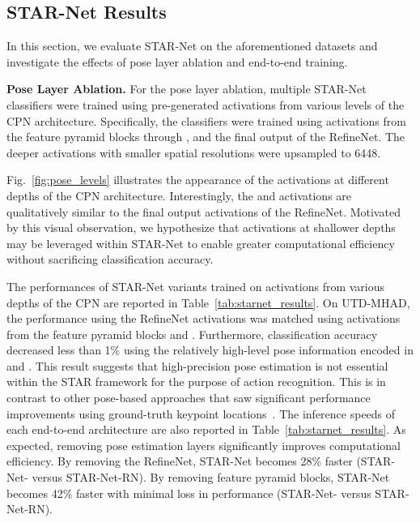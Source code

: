 \documentclass[10pt, conference, compsocconf]{IEEEtran}
\begin{document}
\subsection{STAR-Net Results}
\label{sec:starnet_results}

In this section, we evaluate STAR-Net on the aforementioned datasets and investigate the effects of pose layer ablation and end-to-end training. 

\smallskip\noindent\textbf{Pose Layer Ablation.} For the pose layer ablation, multiple STAR-Net classifiers were trained using pre-generated activations from various levels of the CPN architecture. Specifically, the classifiers were trained using activations from the feature pyramid blocks  through , and the final output of the RefineNet. The deeper activations with smaller spatial resolutions were upsampled to 6448. 


Fig.~\ref{fig:pose_levels} illustrates the appearance of the activations at different depths of the CPN architecture. Interestingly, the  and  activations are qualitatively similar to the final output activations of the RefineNet. Motivated by this visual observation, we hypothesize that activations at shallower depths may be leveraged within STAR-Net to enable greater computational efficiency without sacrificing classification accuracy. 



The performances of STAR-Net variants trained on activations from various depths of the CPN are reported in Table~\ref{tab:starnet_results}. On UTD-MHAD, the performance using the RefineNet activations was matched using activations from the feature pyramid blocks  and . Furthermore, classification accuracy decreased less than 1\% using the relatively high-level pose information encoded in  and . This result suggests that high-precision pose estimation is not essential within the STAR framework for the purpose of action recognition. This is in contrast to other pose-based approaches that saw significant performance improvements using ground-truth keypoint locations~\cite{choutas2018potion, cheronICCV15, zolfaghari2017chained}. The inference speeds of each end-to-end architecture are also reported in Table~\ref{tab:starnet_results}. As expected, removing pose estimation layers significantly improves computational efficiency. By removing the RefineNet, STAR-Net becomes 28\% faster (STAR-Net- versus STAR-Net-RN). By removing feature pyramid blocks, STAR-Net becomes 42\% faster with minimal loss in performance (STAR-Net- versus STAR-Net-RN). 
\end{document}
